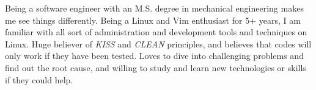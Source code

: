 

\begin{cvparagraph}

Being a software engineer with an M.S. degree in mechanical engineering makes me see things differently. Being a Linux and Vim enthusiast for 5+ years, I am familiar with all sort of administration and development tools and techniques on Linux. Huge believer of \textit{KISS} and \textit{CLEAN} principles, and believes that codes will only work if they have been tested. Loves to dive into challenging problems and find out the root cause, and willing to study and learn new technologies or skills if they could help.
\end{cvparagraph}
